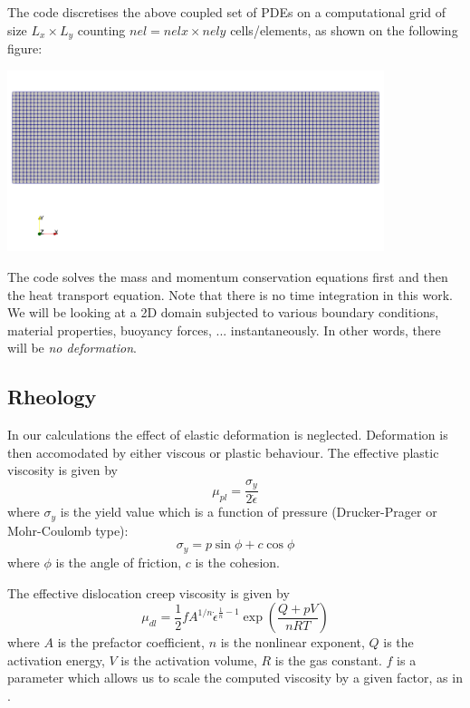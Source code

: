 \documentclass[a4paper]{article}
\begin{document}
The code discretises the above coupled set of PDEs on a computational grid of size $L_x\times L_y$ counting $nel=nelx \times nely$ cells/elements, as shown on the following figure:

\begin{center}
\includegraphics[width=11cm]{images/grid}
\end{center}

The code solves the mass and momentum conservation equations first and then the heat transport equation. 
Note that there is no time integration in this work. We will be looking at a 2D domain subjected to various boundary conditions, material properties, buoyancy forces, ... instantaneously. In other words, there will be {\it no deformation}.



\subsection{Rheology}

In our calculations the effect of elastic deformation is neglected. Deformation is then accomodated by either viscous or plastic behaviour. The effective plastic viscosity is given by \cite{thie11,nabu15,spmw16}
\[
\mu_{pl} = \frac{\sigma_y}{2 \dot{\epsilon}}
\]
where $\sigma_y$ is the yield value which is a function of pressure (Drucker-Prager or Mohr-Coulomb type):
\[
\sigma_y = p \sin \phi + c \cos \phi
\]
where $\phi$ is the angle of friction, $c$ is the cohesion. 

The effective dislocation creep viscosity is given by \cite{thie11}
\[
\mu_{dl}=\frac{1}{2} f A^{1/n} \dot{\epsilon}^{\frac{1}{n}-1} \exp \left( \frac{Q+pV}{nRT}  \right)
\]
where $A$ is the prefactor coefficient, $n$ is the nonlinear exponent, $Q$ is the activation energy, $V$ is the activation volume, $R$ is the gas constant. $f$ is a parameter which allows us to scale the computed viscosity by a given factor, as in \cite{hube11}.
\end{document}
